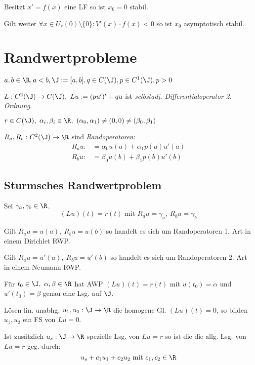 \spacing

Besitzt \(x'=f(x)\) eine LF so ist \(x_0=0\) stabil.

\spacing

Gilt weiter \(\forall x \in U_r(0) \setminus \{0\} : V'(x) \cdot f(x) < 0\) so ist \(x_0\) asymptotisch stabil.

\section*{Randwertprobleme}

\(a,b \in \R, a < b, \J := [a,b], q \in C(\J), p \in C^1(\J), p > 0\)

\(L : C^2(\J) \to C(\J), \ Lu := (pu')'+qu\) ist \emph{selbstadj. Differentialoperator 2. Ordnung}.

\spacing

\(r \in C(\J), \ \alpha_i,\beta_i \in \R, \ (\alpha_0,\alpha_1) \neq (0,0) \neq (\beta_0,\beta_1)\)

\(R_a,R_b : C^2(\J) \to \R\) sind \emph{Randoperatoren}:
\begin{align*}
	R_a u :&= \alpha_0 u(a) + \alpha_1 p(a)u'(a) \\
	R_b u :&= \beta_0 u(b) + \beta_1 p(b)u'(b)
\end{align*}

\subsection*{Sturmsches Randwertproblem}

Sei \(\gamma_a, \gamma_b \in \R\). \[(Lu)(t)=r(t) \text{ mit } R_a u = \gamma_a, \ R_b u = \gamma_b\]

Gilt \(R_a u = u(a), \ R_b u = u(b)\) so handelt es sich um Randoperatoren 1. Art in einem Dirichlet RWP.

\spacing

Gilt \(R_a u = u'(a), \ R_b u = u'(b)\) so handelt es sich um Randoperatoren 2. Art in einem Neumann RWP.

\spacing

Für \(t_0 \in \J, \ \alpha,\beta \in \R\) hat AWP \((Lu)(t)=r(t)\) mit \(u(t_0)=\alpha\) und \(u'(t_0)=\beta\) genau eine Lsg. auf \(\J\).

\spacing

Lösen lin. unabhg. \(u_1,u_2 : \J \to \R\) die homogene Gl. \((Lu)(t)=0\), so bilden \(u_1,u_2\) ein FS von \(Lu=0\).

Ist zusätzlich \(u_s : \J \to \R\) spezielle Lsg. von \(Lu=r\) so ist die die allg. Lsg. von \(Lu=r\) geg. durch: \[u_s+c_1 u_1+c_2 u_2 \text{ mit } c_1, c_2 \in \R\]

